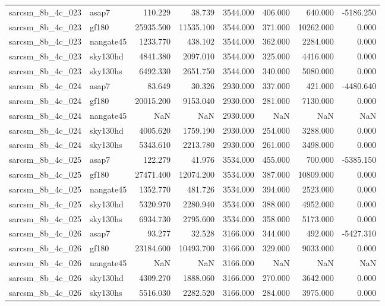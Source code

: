 \begin{tabular}{llrrrrrr}
sarcsm\_8b\_4c\_023 & asap7 & 110.229 & 38.739 & 3544.000 & 406.000 & 640.000 & -5186.250 \\
sarcsm\_8b\_4c\_023 & gf180 & 25935.500 & 11535.100 & 3544.000 & 371.000 & 10262.000 & 0.000 \\
sarcsm\_8b\_4c\_023 & nangate45 & 1233.770 & 438.102 & 3544.000 & 362.000 & 2284.000 & 0.000 \\
sarcsm\_8b\_4c\_023 & sky130hd & 4841.380 & 2097.010 & 3544.000 & 325.000 & 4416.000 & 0.000 \\
sarcsm\_8b\_4c\_023 & sky130hs & 6492.330 & 2651.750 & 3544.000 & 340.000 & 5080.000 & 0.000 \\
sarcsm\_8b\_4c\_024 & asap7 & 83.649 & 30.326 & 2930.000 & 337.000 & 421.000 & -4480.640 \\
sarcsm\_8b\_4c\_024 & gf180 & 20015.200 & 9153.040 & 2930.000 & 281.000 & 7130.000 & 0.000 \\
sarcsm\_8b\_4c\_024 & nangate45 & NaN & NaN & 2930.000 & NaN & NaN & NaN \\
sarcsm\_8b\_4c\_024 & sky130hd & 4005.620 & 1759.190 & 2930.000 & 254.000 & 3288.000 & 0.000 \\
sarcsm\_8b\_4c\_024 & sky130hs & 5343.610 & 2213.780 & 2930.000 & 261.000 & 3498.000 & 0.000 \\
sarcsm\_8b\_4c\_025 & asap7 & 122.279 & 41.976 & 3534.000 & 455.000 & 700.000 & -5385.150 \\
sarcsm\_8b\_4c\_025 & gf180 & 27471.400 & 12074.200 & 3534.000 & 387.000 & 10809.000 & 0.000 \\
sarcsm\_8b\_4c\_025 & nangate45 & 1352.770 & 481.726 & 3534.000 & 394.000 & 2523.000 & 0.000 \\
sarcsm\_8b\_4c\_025 & sky130hd & 5320.970 & 2280.940 & 3534.000 & 388.000 & 4952.000 & 0.000 \\
sarcsm\_8b\_4c\_025 & sky130hs & 6934.730 & 2795.600 & 3534.000 & 358.000 & 5173.000 & 0.000 \\
sarcsm\_8b\_4c\_026 & asap7 & 93.277 & 32.528 & 3166.000 & 344.000 & 492.000 & -5427.310 \\
sarcsm\_8b\_4c\_026 & gf180 & 23184.600 & 10493.700 & 3166.000 & 329.000 & 9033.000 & 0.000 \\
sarcsm\_8b\_4c\_026 & nangate45 & NaN & NaN & 3166.000 & NaN & NaN & NaN \\
sarcsm\_8b\_4c\_026 & sky130hd & 4309.270 & 1888.060 & 3166.000 & 270.000 & 3642.000 & 0.000 \\
sarcsm\_8b\_4c\_026 & sky130hs & 5516.030 & 2282.520 & 3166.000 & 284.000 & 3975.000 & 0.000 \\

\end{tabular}
